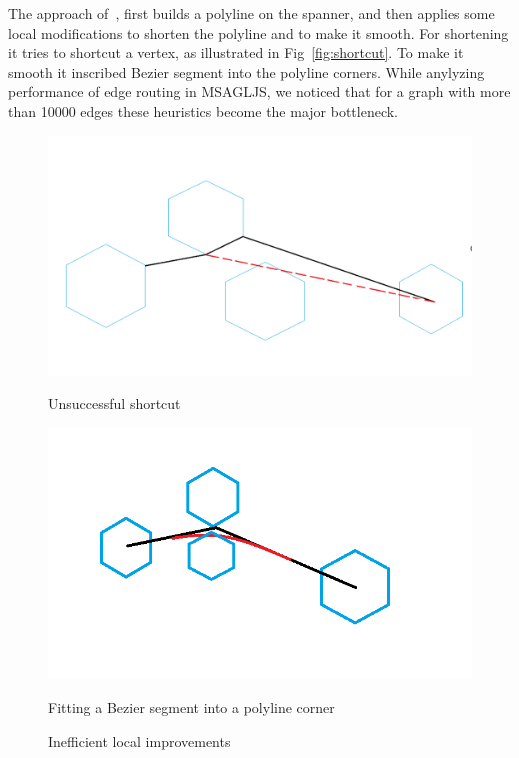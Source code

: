 \documentclass{gd-llncs}
\begin{document}
The approach of~\cite{dwyer2010fast}, first builds a polyline on the spanner, and then applies some local modifications to shorten the polyline and to make it smooth. For shortening it tries to shortcut a vertex, as illustrated in Fig~\ref{fig:shortcut}. To make it smooth it inscribed Bezier segment into the polyline corners. While anylyzing performance of edge routing in MSAGLJS, we noticed that for a graph with more than 10000 edges these heuristics become the major bottleneck.
\begin{figure}[!tbp]
  \centering
  \begin{minipage}[b]{0.4\textwidth}
    \includegraphics[width=\textwidth]{./naive_shorcut_now_working.png}

    \caption{Unsuccessful shortcut}
  \end{minipage}
  \hfill
  \begin{minipage}[b]{0.4\textwidth}
    \includegraphics[width=\textwidth]{fillet_corner.png}
    \caption{Fitting a Bezier segment into a polyline corner}
  \end{minipage}
  \caption*{Inefficient local improvements}
\end{figure}
\end{document}
